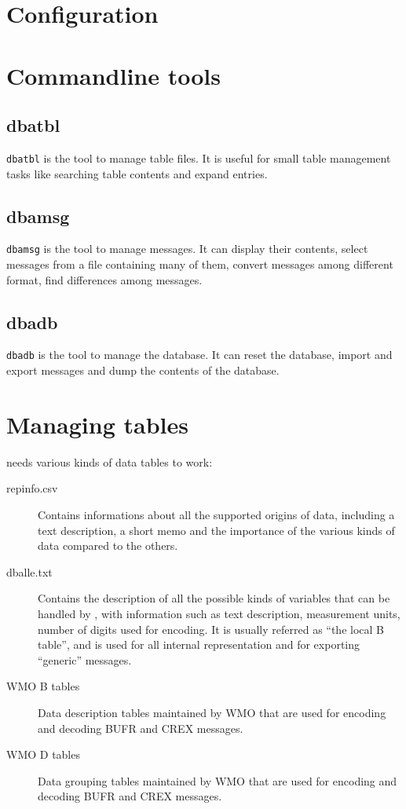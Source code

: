 \section {Configuration}



\section {Commandline tools}

\subsection{dbatbl}

{\tt dbatbl} is the tool to manage table files.  It is useful for small
table management tasks like searching table contents and expand entries.

\subsection{dbamsg}

{\tt dbamsg} is the tool to manage messages.  It can display their contents,
select messages from a file containing many of them, convert messages among
different format, find differences among messages.

\subsection{dbadb}

{\tt dbadb} is the tool to manage the \dballe{} database.  It can reset the
database, import and export messages and dump the contents of the database.

\section {Managing tables}

\dballe{} needs various kinds of data tables to work:

\begin{description}
\item[repinfo.csv]
  Contains informations about all the supported origins of data, including a
  text description, a short memo and the importance of the various kinds of
  data compared to the others.
\item[dballe.txt]
  Contains the description of all the possible kinds of variables that can be
  handled by \dballe{}, with information such as text description, measurement
  units, number of digits used for encoding.  It is usually referred as ``the
  local B table'', and is used for all internal representation and for
  exporting ``generic'' messages.
\item[WMO B tables]
  Data description tables maintained by WMO that are used for encoding and
  decoding BUFR and CREX messages.
\item[WMO D tables]
  Data grouping tables maintained by WMO that are used for encoding and
  decoding BUFR and CREX messages.
\end{description}

